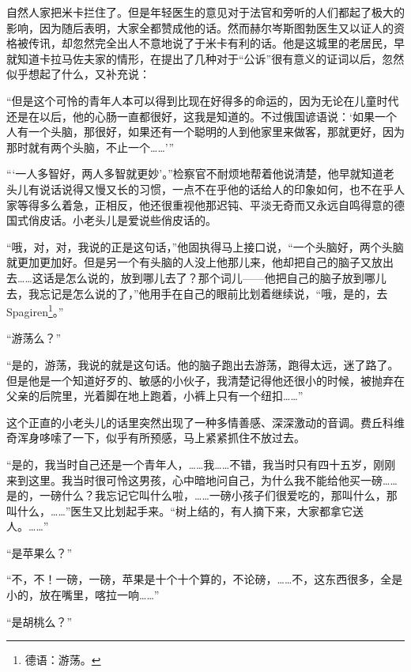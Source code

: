 \par 自然人家把米卡拦住了。但是年轻医生的意见对于法官和旁听的人们都起了极大的影响，因为随后表明，大家全都赞成他的话。然而赫尔岑斯图勃医生又以证人的资格被传讯，却忽然完全出人不意地说了于米卡有利的话。他是这城里的老居民，早就知道卡拉马佐夫家的情形，在提出了几种对于“公诉”很有意义的证词以后，忽然似乎想起了什么，又补充说：
\par “但是这个可怜的青年人本可以得到比现在好得多的命运的，因为无论在儿童时代还是在以后，他的心肠一直都很好，这我是知道的。不过俄国谚语说：‘如果一个人有一个头脑，那很好，如果还有一个聪明的人到他家里来做客，那就更好，因为那时就有两个头脑，不止一个……’”
\par “‘一人多智好，两人多智就更妙’。”检察官不耐烦地帮着他说清楚，他早就知道老头儿有说话说得又慢又长的习惯，一点不在乎他的话给人的印象如何，也不在乎人家等得多么着急，正相反，他还很重视他那迟钝、平淡无奇而又永远自鸣得意的德国式俏皮话。小老头儿是爱说些俏皮话的。
\par “哦，对，对，我说的正是这句话，”他固执得马上接口说，“一个头脑好，两个头脑就更加更加好。但是另一个有头脑的人没上他那儿来，他却把自己的脑子又放出去……这话是怎么说的，放到哪儿去了？那个词儿——他把自己的脑子放到哪儿去，我忘记是怎么说的了，”他用手在自己的眼前比划着继续说，“哦，是的，去Spagiren\footnote{德语：游荡。}。”
\par “游荡么？”
\par “是的，游荡，我说的就是这句话。他的脑子跑出去游荡，跑得太远，迷了路了。但是他是一个知道好歹的、敏感的小伙子，我清楚记得他还很小的时候，被抛弃在父亲的后院里，光着脚在地上跑着，小裤上只有一个纽扣……”
\par 这个正直的小老头儿的话里突然出现了一种多情善感、深深激动的音调。费丘科维奇浑身哆嗦了一下，似乎有所预感，马上紧紧抓住不放过去。
\par “是的，我当时自己还是一个青年人，……我……不错，我当时只有四十五岁，刚刚来到这里。我当时很可怜这男孩，心中暗地问自己，为什么我不能给他买一磅……是的，一磅什么？我忘记它叫什么啦，……一磅小孩子们很爱吃的，那叫什么，那叫什么，……”医生又比划起手来。“树上结的，有人摘下来，大家都拿它送人。……”
\par “是苹果么？”
\par “不，不！一磅，一磅，苹果是十个十个算的，不论磅，……不，这东西很多，全是小的，放在嘴里，喀拉一响……”
\par “是胡桃么？”
